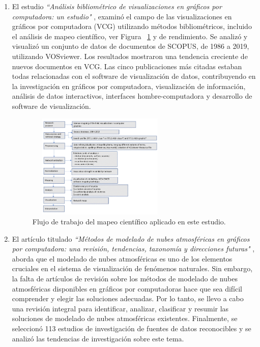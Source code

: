 \documentclass[10pt,conference]{IEEEtran}
\begin{document}
\begin{enumerate}
\item El estudio \textit{“Análisis bibliométrico de visualizaciones en gráficos por computadora: un estudio"} \citep{bio}, examinó el campo de las visualizaciones en gráficos por computadora (VCG) utilizando métodos bibliométricos, incluido el análisis de mapeo científico, ver Figura ~\ref{fbio} y de rendimiento. Se analizó y visualizó un conjunto de datos de documentos de SCOPUS, de 1986 a 2019, utilizando VOSviewer. Los resultados mostraron una tendencia creciente de nuevos documentos en VCG. Las cinco publicaciones más citadas estaban todas relacionadas con el software de visualización de datos, contribuyendo en la investigación en gráficos por computadora, visualización de información, análisis de datos interactivos, interfaces hombre-computadora y desarrollo de software de visualización.

\begin{figure}[H]
 \begin{center}
       \includegraphics[width=7cm, height=5cm]{figuras/bio.PNG}
      \caption{Flujo de trabajo del mapeo científico aplicado en este estudio.}
      \label{fbio} 
      \end{center}
\end{figure}

\item El artículo titulado \textit{“Métodos de modelado de nubes atmosféricas en gráficos por computadora: una revisión, tendencias, taxonomía y direcciones futuras"} \citep{visu}, aborda que el modelado de nubes atmosféricas es uno de los elementos cruciales en el sistema de visualización de fenómenos naturales. Sin embargo, la falta de artículos de revisión sobre los métodos de modelado de nubes atmosféricas disponibles en gráficos por computadoras hace que sea difícil comprender y elegir las soluciones adecuadas. Por lo tanto, se llevo a cabo una revisión integral para identificar, analizar, clasificar y resumir las soluciones de modelado de nubes atmosféricas existentes. Finalmente, se seleccionó 113 estudios de investigación de fuentes de datos reconocibles y se analizó las tendencias de investigación sobre este tema. 


\end{enumerate}
\end{document}
